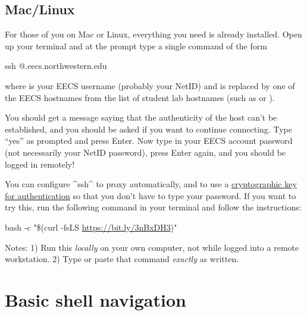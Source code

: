 \documentclass{tufte-handout}
\def\setupScriptUrl{https://bit.ly/3nBxDH3}
\def\setupScriptLink{\href{\setupScriptUrl}{\setupScriptUrl}}
\begin{document}
\subsection{Mac/Linux}

For those of you on Mac or Linux, everything you need is already
installed. Open up your terminal and at the prompt
type a single command of the form

\begin{CmdLine*}
  \C ssh @.eecs.northwestern.edu\\
\end{CmdLine*}

\noindent where  is your EECS username (probably your NetID)
and  is replaced by one of the EECS hostnames from the list
of student lab hostnames%
\marginnote{\LabHostnamesLink}
(such as  or
).

You should get a message saying that the authenticity of the host
can't be established, and you should be asked if you want to continue
connecting.  Type ``yes'' as prompted and press Enter. Now type in your
EECS account password (not necessarily your NetID password), press
Enter again, and you should be logged in remotely!

You can configure ^ssh^ to proxy automatically, and to use a
\href{https://en.wikipedia.org/wiki/Key_authentication}{cryptographic
key for authentication} so that you don’t have to type your password. If
you want to try this, run the following command in your terminal and
follow the instructions:

\begin{CmdLine*}
  \C bash -c "\$(curl -fsLS \setupScriptLink)"\\
\end{CmdLine*}

Notes: 1) Run this \emph{locally} on your own computer, not while logged
into a remote workstation. 2) Type or paste that command \emph{exactly}
as written.

\section{Basic shell navigation}
\end{document}
